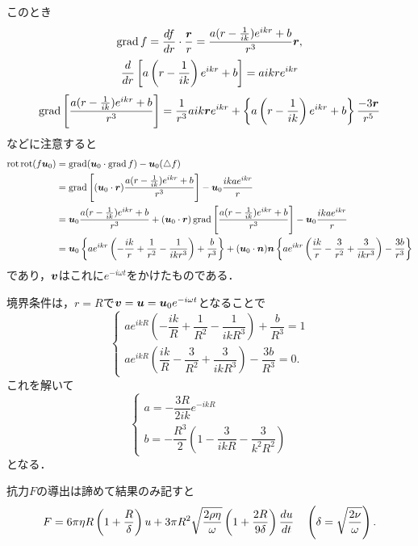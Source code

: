 \begin{kaitou}
このとき
\[
    \operatorname{grad} f = \dv{f}{r} \cdot \frac{\vb*{r}}{r}
    = \frac{a(r-\frac{1}{ik})e^{ikr}+b}{r^3} \vb*{r},
\]
\[
    \dv{r} \left[ a \left( r-\frac{1}{ik} \right) e^{ikr}+b \right] = a ikr e^{ikr}
\]
\[
    \operatorname{grad} \left[ \frac{a(r-\frac{1}{ik})e^{ikr}+b}{r^3} \right]
    = \frac{1}{r^3} a ik \vb*{r} e^{ikr} + \left\{ a \left( r-\frac{1}{ik} \right) e^{ikr}+b \right\} \frac{-3\vb*{r}}{r^5}
\]
などに注意すると
\begin{align*}
    \operatorname{rot}\operatorname{rot}(f\vb*{u}_0) &= \operatorname{grad}(\vb*{u}_0 \cdot \operatorname{grad} f) - \vb*{u}_0 (\triangle f) \\
    &= \operatorname{grad}\left[ (\vb*{u}_0\cdot\vb*{r}) \frac{a(r-\frac{1}{ik})e^{ikr}+b}{r^3} \right] - \vb*{u}_0 \frac{ika e^{ikr}}{r} \\
    &= \vb*{u}_0 \frac{a(r-\frac{1}{ik})e^{ikr}+b}{r^3} + (\vb*{u}_0\cdot\vb*{r}) \operatorname{grad} \left[ \frac{a(r-\frac{1}{ik})e^{ikr}+b}{r^3} \right] - \vb*{u}_0 \frac{ika e^{ikr}}{r} \\
    &= \vb*{u}_0 \left\{ a e^{ikr} \left( -\frac{ik}{r} + \frac{1}{r^2} - \frac{1}{ikr^3} \right) + \frac{b}{r^3} \right\} 
    + (\vb*{u}_0\cdot\vb*{n})\vb*{n} \left\{ a e^{ikr} \left( \frac{ik}{r} - \frac{3}{r^2} + \frac{3}{ikr^3} \right) - \frac{3b}{r^3} \right\} 
\end{align*}
であり，$\vb*{v}$はこれに$e^{-i\omega t}$をかけたものである．


境界条件は，$r=R$で$\vb*{v}=\vb*{u} = \vb*{u}_0 e^{-i\omega t}$となることで
\[
    \begin{cases}
        a e^{ikR} \left( -\dfrac{ik}{R} + \dfrac{1}{R^2} - \dfrac{1}{ikR^3} \right) + \dfrac{b}{R^3} = 1 \\[8pt]
        a e^{ikR} \left( \dfrac{ik}{R} - \dfrac{3}{R^2} + \dfrac{3}{ikR^3} \right) - \dfrac{3b}{R^3} = 0 .
    \end{cases}
\]
これを解いて
\[
    \begin{cases}
        a = - \dfrac{3R}{2ik} e^{-ikR} \\[8pt]
        b = - \dfrac{R^3}{2} \left( 1 - \dfrac{3}{ikR} - \dfrac{3}{k^2R^2} \right)
    \end{cases}
\]
となる．



抗力$F$の導出は諦めて結果のみ記すと
\[
    F = 6\pi\eta R \left( 1 + \frac{R}{\delta} \right) u 
    + 3\pi R^2 \sqrt{\frac{2\rho\eta}{\omega}} \left( 1 + \frac{2R}{9\delta} \right) \dv{u}{t}
    \quad \left( \delta = \sqrt{\frac{2\nu}{\omega}} \right).
\]


\end{kaitou}
